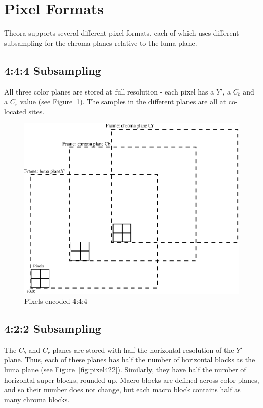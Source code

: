 \documentclass[9pt,letterpaper]{book}
\numberwithin{equation}{chapter}
\numberwithin{figure}{chapter}
\numberwithin{table}{chapter}
\begin{document}
\section{Pixel Formats}
\label{sec:pixfmts}

Theora supports several different pixel formats, each of which uses different
 subsampling for the chroma planes relative to the luma plane.

\subsection{4:4:4 Subsampling}
\label{sec:444}

All three color planes are stored at full resolution - each pixel has a $Y'$,
 a $C_b$ and a $C_r$ value (see Figure~\ref{fig:pixel444}).
The samples in the different planes are all at co-located sites.

\begin{figure}[htbp]
\begin{center}
\includegraphics{pixel444}
\end{center}
\caption{Pixels encoded 4:4:4}
\label{fig:pixel444}
\end{figure}

%
%
%
%
%
%


\subsection{4:2:2 Subsampling}
\label{sec:422}

The $C_b$ and $C_r$ planes are stored with half the horizontal resolution of
 the $Y'$ plane.
Thus, each of these planes has half the number of horizontal blocks as the luma
 plane (see Figure~\ref{fig:pixel422}).
Similarly, they have half the number of horizontal super blocks, rounded up.
Macro blocks are defined across color planes, and so their number does not
 change, but each macro block contains half as many chroma blocks.
\end{document}
